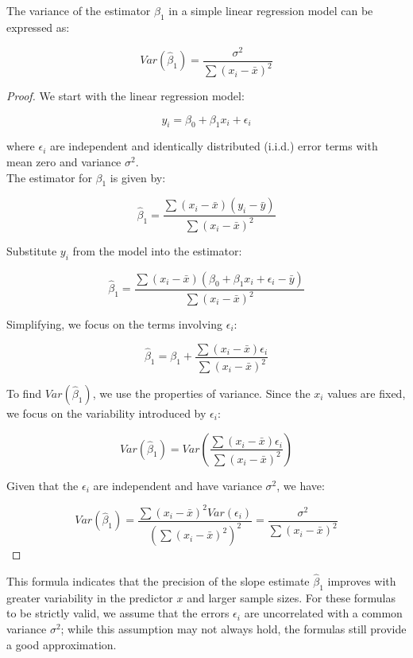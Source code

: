 \begin{theorem}
    The variance of the estimator \(\hat{\beta}_1\) in a simple linear regression model can be expressed as:

\[
Var(\hat{\beta}_1) = \frac{\sigma^2}{\sum (x_i - \bar{x})^2}
\]
\end{theorem}

\begin{proof}
    We start with the linear regression model:

   \[
   y_i = \beta_0 + \beta_1 x_i + \epsilon_i
   \]

   where \(\epsilon_i\) are independent and identically distributed (i.i.d.) error terms with mean zero and variance \(\sigma^2\). \\

   The estimator for \(\beta_1\) is given by:

   \[
   \hat{\beta}_1 = \frac{\sum (x_i - \bar{x})(y_i - \bar{y})}{\sum (x_i - \bar{x})^2}
   \]

   Substitute \(y_i\) from the model into the estimator:

   \[
   \hat{\beta}_1 = \frac{\sum (x_i - \bar{x})(\beta_0 + \beta_1 x_i + \epsilon_i - \bar{y})}{\sum (x_i - \bar{x})^2}
   \]

   Simplifying, we focus on the terms involving \(\epsilon_i\):

   \[
   \hat{\beta}_1 = \beta_1 + \frac{\sum (x_i - \bar{x}) \epsilon_i}{\sum (x_i - \bar{x})^2}
   \]

   To find \(Var(\hat{\beta}_1)\), we use the properties of variance. Since the \(x_i\) values are fixed, we focus on the variability introduced by \(\epsilon_i\):

   \[
   Var(\hat{\beta}_1) = Var\left(\frac{\sum (x_i - \bar{x}) \epsilon_i}{\sum (x_i - \bar{x})^2}\right)
   \]

   Given that the \(\epsilon_i\) are independent and have variance \(\sigma^2\), we have:

   \[
   Var(\hat{\beta}_1) = \frac{\sum (x_i - \bar{x})^2 Var(\epsilon_i)}{(\sum (x_i - \bar{x})^2)^2} = \frac{\sigma^2}{\sum (x_i - \bar{x})^2}
   \]

\end{proof}

This formula indicates that the precision of the slope estimate \(\hat{\beta}_1\) improves with greater variability in the predictor \(x\) and larger sample sizes. For these formulas to be strictly valid, we assume that the errors \(\epsilon_i\) are uncorrelated with a common variance \(\sigma^2\); while this assumption may not always hold, the formulas still provide a good approximation.

